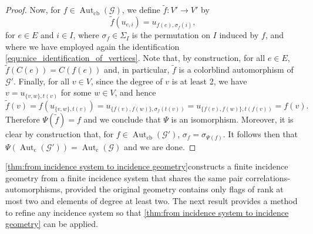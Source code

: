 \documentclass{amsart}
\theoremstyle{definition}
\theoremstyle{remark}
\newcommand{\Aut}{\operatorname{Aut}}
\newcommand{\Autcb}{\Aut_{\text{cb}}}
\newcommand{\Autc}{\Aut_{\text{c}}}
\newcommand{\G}{\mathcal{G}}
\begin{document}
\begin{proof}
Now, for $f\in \Autcb(\mathcal{G})$, we define $\widetilde{f}\colon V'\to V'$ by
\[
\widetilde{f}(u_{e,i})=u_{f(e),\sigma_f(i)},
\]
for $e\in E$ and $i\in I$, where $\sigma_f\in\Sigma_I$ is the permutation on $I$ induced by $f$, and where we have employed again the identification \eqref{equ:nice_identification_of_vertices}. Note that, by construction, for all $e\in E$, $\widetilde{f}(C(e))=C(f(e))$ and, in particular, $\widetilde{f}$ is a colorblind automorphism of $\G'$. Finally, for all $v\in V$, since the degree of $v$ is at least 2, we have $v=u_{\{v,w\},t(v)}$ for some $w\in V$, and hence
\[
\widetilde{f}(v)=f(u_{\{v,w\},t(v)})=u_{\{f(v),f(w)\},\sigma_f(t(v))}=u_{\{f(v),f(w)\},t(f(v))}=f(v).
\]
Therefore $\Psi(\widetilde{f})=f$ and we conclude that $\Psi$ is an isomorphism. Moreover, it is clear by construction that, for $f\in\Autcb(\G')$, $\sigma_f=\sigma_{\Psi(f)}$. It follows then that $\Psi(\Autc(\G'))=\Autc(\G)$ and we are done.
\end{proof}

\autoref{thm:from incidence system to incidence geometry}constructs a finite incidence geometry from a finite incidence system that shares the same pair correlations-automorphisms, provided the original geometry contains only flags of rank at most two and elements of degree at least two. The next result provides a method to refine any incidence system so that \autoref{thm:from incidence system to incidence geometry} can be applied.  
\end{document}
